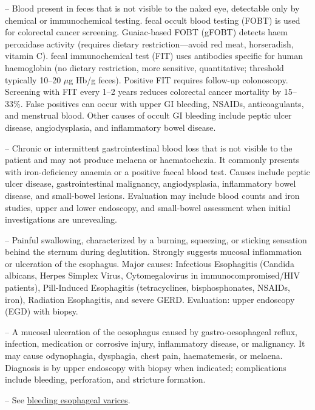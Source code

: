 -- Blood present in feces that is not visible to the naked eye, detectable only by chemical or immunochemical testing. fecal occult blood testing (FOBT) is used for colorectal cancer screening. Guaiac-based FOBT (gFOBT) detects haem peroxidase activity (requires dietary restriction—avoid red meat, horseradish, vitamin C). fecal immunochemical test (FIT) uses antibodies specific for human haemoglobin (no dietary restriction, more sensitive, quantitative; threshold typically 10--20 \(\mu\)g Hb/g feces). Positive FIT requires follow-up colonoscopy. Screening with FIT every 1--2 years reduces colorectal cancer mortality by 15--33\%. False positives can occur with upper GI bleeding, NSAIDs, anticoagulants, and menstrual blood. Other causes of occult GI bleeding include peptic ulcer disease, angiodysplasia, and inflammatory bowel disease.

-- Chronic or intermittent gastrointestinal blood loss that is not visible to the patient and may not produce melaena or haematochezia. It commonly presents with iron-deficiency anaemia or a positive faecal blood test. Causes include peptic ulcer disease, gastrointestinal malignancy, angiodysplasia, inflammatory bowel disease, and small-bowel lesions. Evaluation may include blood counts and iron studies, upper and lower endoscopy, and small-bowel assessment when initial investigations are unrevealing.

-- Painful swallowing, characterized by a burning, squeezing, or sticking sensation behind the sternum during deglutition. Strongly suggests mucosal inflammation or ulceration of the esophagus. Major causes: Infectious Esophagitis (Candida albicans, Herpes Simplex Virus, Cytomegalovirus in immunocompromised/HIV patients), Pill-Induced Esophagitis (tetracyclines, bisphosphonates, NSAIDs, iron), Radiation Esophagitis, and severe GERD. Evaluation: upper endoscopy (EGD) with biopsy.

-- A mucosal ulceration of the oesophagus caused by gastro-oesophageal reflux, infection, medication or corrosive injury, inflammatory disease, or malignancy. It may cause odynophagia, dysphagia, chest pain, haematemesis, or melaena. Diagnosis is by upper endoscopy with biopsy when indicated; complications include bleeding, perforation, and stricture formation.

-- See \hyperlink{Bleeding Esophageal Varices}{bleeding esophageal varices}.

